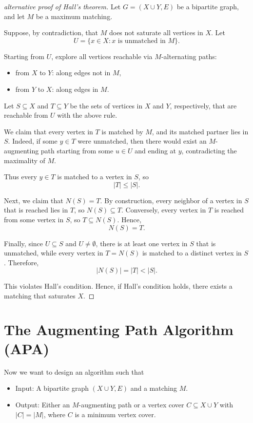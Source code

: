 \begin{proof}[alternative proof of Hall's theorem]
Let \(G = (X \cup Y, E)\) be a bipartite graph, and let \(M\) be a maximum matching.

Suppose, by contradiction, that \(M\) does not saturate all vertices in \(X\).  
Let
\[
U = \{x \in X : x \text{ is unmatched in } M\}.
\]

Starting from \(U\), explore all vertices reachable via \(M\)-alternating paths:
\begin{itemize}
    \item from \(X\) to \(Y\): along edges not in \(M\),
    \item from \(Y\) to \(X\): along edges in \(M\).
\end{itemize}

Let \(S \subseteq X\) and \(T \subseteq Y\) be the sets of vertices in \(X\) and \(Y\), respectively, that are reachable from \(U\) with the above rule.

We claim that every vertex in \(T\) is matched by \(M\), and its matched partner lies in \(S\).  
Indeed, if some \(y \in T\) were unmatched, then there would exist an \(M\)-augmenting path starting from some \(u \in U\) and ending at \(y\), contradicting the maximality of \(M\).

Thus every \(y \in T\) is matched to a vertex in \(S\), so
\[
|T| \le |S|.
\]

Next, we claim that \(N(S) = T\).  
By construction, every neighbor of a vertex in \(S\) that is reached lies in \(T\), so \(N(S) \subseteq T\).  
Conversely, every vertex in \(T\) is reached from some vertex in \(S\), so \(T \subseteq N(S)\).  
Hence,
\[
N(S) = T.
\]

Finally, since \(U \subseteq S\) and \(U \neq \emptyset\), there is at least one vertex in \(S\) that is unmatched, while every vertex in \(T = N(S)\) is matched to a distinct vertex in \(S\).  
Therefore,
\[
|N(S)| = |T| < |S|.
\]

This violates Hall's condition. Hence, if Hall's condition holds, there exists a matching that saturates \(X\).        

\end{proof}

\section{The Augmenting Path Algorithm (APA)}
Now we want to design an algorithm such that
\begin{itemize}
    \item Input: A bipartite graph \((X \cup Y, E)\) and a matching \(M\). 
    \item Output: Either an \(M\)-augmenting path or a vertex cover \(C \subseteq X \cup Y\) with \(\vert C \vert = \vert M \vert  \), where \(C\) is a minimum vertex cover.     
\end{itemize}

